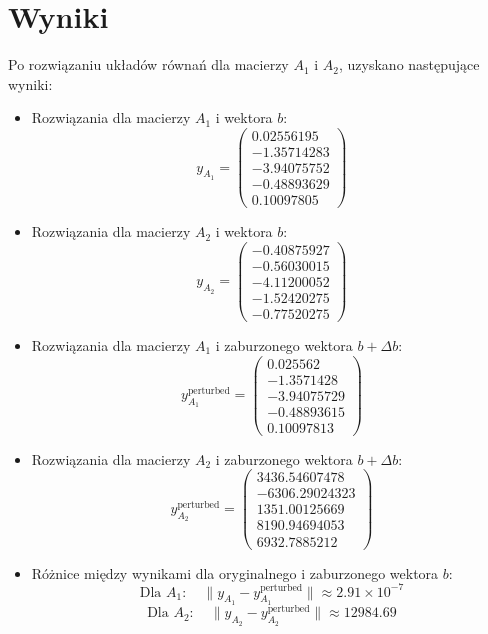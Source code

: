 \documentclass[a4paper, 12pt]{article}
\begin{document}
\section{Wyniki}
Po rozwiązaniu układów równań dla macierzy \( A_1 \) i \( A_2 \), uzyskano następujące wyniki:
\begin{itemize}
    \item Rozwiązania dla macierzy \( A_1 \) i wektora \( b \):
    \[
    y_{A_1} = \begin{pmatrix} 0.02556195 \\ -1.35714283 \\ -3.94075752 \\ -0.48893629 \\ 0.10097805 \end{pmatrix}
    \]
    \item Rozwiązania dla macierzy \( A_2 \) i wektora \( b \):
    \[
    y_{A_2} = \begin{pmatrix} -0.40875927 \\ -0.56030015 \\ -4.11200052 \\ -1.52420275 \\ -0.77520275 \end{pmatrix}
    \]
    \item Rozwiązania dla macierzy \( A_1 \) i zaburzonego wektora \( b + \Delta b \):
    \[
    y_{A_1}^{\text{perturbed}} = \begin{pmatrix} 0.025562 \\ -1.3571428 \\ -3.94075729 \\ -0.48893615 \\ 0.10097813 \end{pmatrix}
    \]
    \item Rozwiązania dla macierzy \( A_2 \) i zaburzonego wektora \( b + \Delta b \):
    \[
    y_{A_2}^{\text{perturbed}} = \begin{pmatrix} 3436.54607478 \\ -6306.29024323 \\ 1351.00125669 \\ 8190.94694053 \\ 6932.7885212 \end{pmatrix}
    \]
    \item Różnice między wynikami dla oryginalnego i zaburzonego wektora \( b \):
    \[
    \text{Dla } A_1: \quad \| y_{A_1} - y_{A_1}^{\text{perturbed}} \| \approx 2.91 \times 10^{-7}
    \]
    \[
    \text{Dla } A_2: \quad \| y_{A_2} - y_{A_2}^{\text{perturbed}} \| \approx 12984.69
    \]
\end{itemize}
\end{document}
